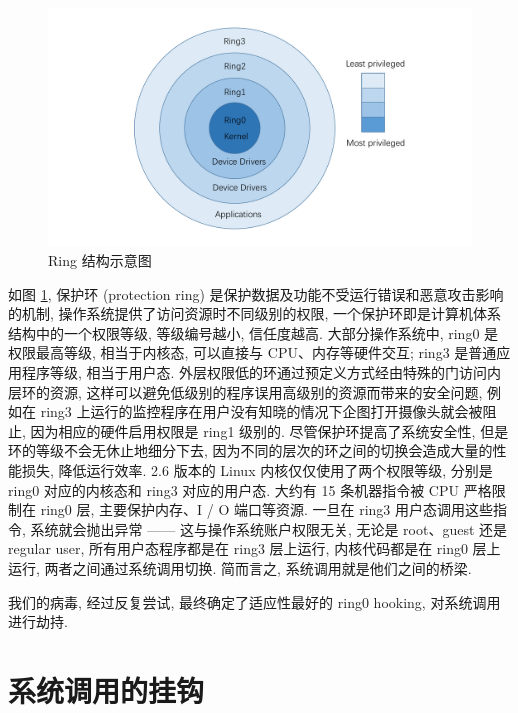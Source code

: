 \documentclass[11pt,fleqn]{book} %
\begin{document}
\begin{figure}[H]
\begin{centering}
\includegraphics[width=0.4\paperwidth]{image/ring}
\par\end{centering}

\caption{Ring 结构示意图\label{fig:Ring-=007ED3=006784=00793A=00610F=0056FE}}


\end{figure}


如图 \ref{fig:Ring-=007ED3=006784=00793A=00610F=0056FE}, 保护环 (protection
ring) 是保护数据及功能不受运行错误和恶意攻击影响的机制, 操作系统提供了访问资源时不同级别的权限, 一个保护环即是计算机体系结构中的一个权限等级,
等级编号越小, 信任度越高. 大部分操作系统中, ring0 是权限最高等级, 相当于内核态, 可以直接与 CPU、内存等硬件交互;
ring3 是普通应用程序等级, 相当于用户态. 外层权限低的环通过预定义方式经由特殊的门访问内层环的资源, 这样可以避免低级别的程序误用高级别的资源而带来的安全问题,
例如在 ring3 上运行的监控程序在用户没有知晓的情况下企图打开摄像头就会被阻止, 因为相应的硬件启用权限是 ring1 级别的.
尽管保护环提高了系统安全性, 但是环的等级不会无休止地细分下去, 因为不同的层次的环之间的切换会造成大量的性能损失, 降低运行效率.
2.6 版本的 Linux 内核仅仅使用了两个权限等级, 分别是 ring0 对应的内核态和 ring3 对应的用户态. 大约有 15
条机器指令被 CPU 严格限制在 ring0 层, 主要保护内存、I / O 端口等资源. 一旦在 ring3 用户态调用这些指令,
系统就会抛出异常 —— 这与操作系统账户权限无关, 无论是 root、guest 还是 regular user, 所有用户态程序都是在
ring3 层上运行, 内核代码都是在 ring0 层上运行, 两者之间通过系统调用切换. 简而言之, 系统调用就是他们之间的桥梁.

我们的病毒, 经过反复尝试, 最终确定了适应性最好的 ring0 hooking, 对系统调用进行劫持.


\section{系统调用的挂钩}
\end{document}
